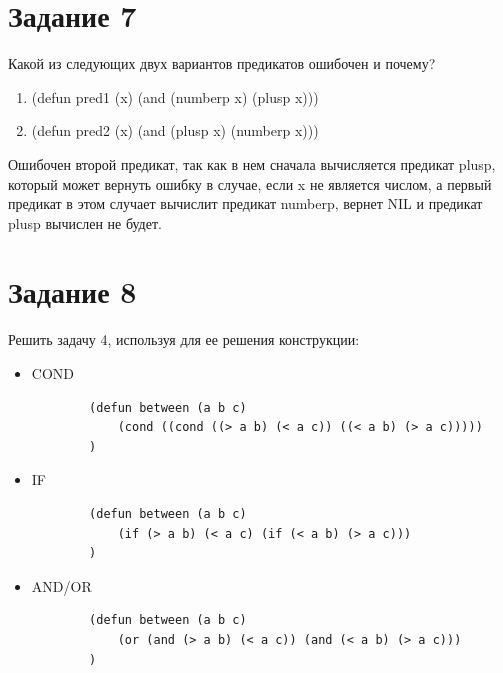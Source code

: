 \documentclass[a4paper, 12pt]{article}
\begin{document}
\section*{Задание 7}
Какой из следующих двух вариантов предикатов ошибочен и почему?\\

\begin{enumerate}
	\item (defun pred1 (x) (and (numberp x) (plusp x)))
	\item (defun pred2 (x) (and (plusp x) (numberp x)))
\end{enumerate} 

Ошибочен второй предикат, так как в нем сначала вычисляется предикат plusp, который может вернуть ошибку в случае, если x не является числом, а первый предикат в этом случает вычислит предикат numberp, вернет NIL и предикат plusp вычислен не будет.\\


\section*{Задание 8}
Решить задачу 4, используя для ее решения конструкции:\\

\begin{itemize}
	\item COND\\
	\begin{lstlisting}
		(defun between (a b c) 
			(cond ((cond ((> a b) (< a c)) ((< a b) (> a c)))))
		)
	\end{lstlisting}
	\item IF\\
	\begin{lstlisting}
		(defun between (a b c) 
			(if (> a b) (< a c) (if (< a b) (> a c)))
		)
	\end{lstlisting}
	
	\item AND/OR\\
	\begin{lstlisting}
		(defun between (a b c) 
			(or (and (> a b) (< a c)) (and (< a b) (> a c)))
		)
	\end{lstlisting}
\end{itemize}
\end{document}

